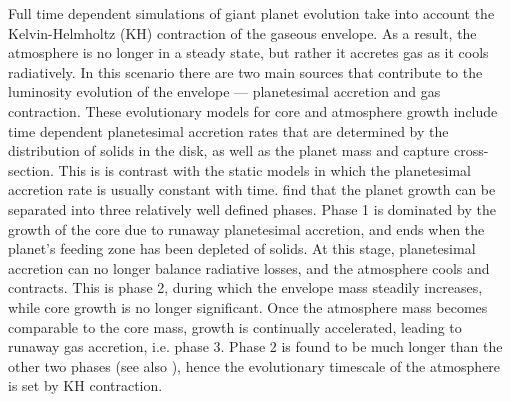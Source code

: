 \documentclass[apj, numberedappendix]{emulateapj}
\begin{document}


Full time dependent simulations of giant planet evolution take into account the Kelvin-Helmholtz (KH) contraction of the gaseous envelope. As a result, the atmosphere is no longer in a steady state, but rather it accretes gas as it cools radiatively. In this scenario there are two main sources that contribute to the luminosity evolution of the envelope --- planetesimal accretion and gas contraction. These evolutionary models for core and atmosphere growth include time dependent planetesimal accretion rates that are determined by the distribution of solids in the disk, as well as the planet mass and capture cross-section. This is is contrast with the static models in which the planetesimal accretion rate is usually constant with time. \citet{pollack96} find that the planet growth can be separated into three relatively well defined phases. Phase 1 is dominated by the growth of the core due to runaway planetesimal accretion, and ends when the planet's feeding zone has been depleted of solids. At this stage, planetesimal accretion can no longer balance radiative losses, and the atmosphere cools and contracts. This is phase 2, during which the envelope mass steadily increases, while core growth is no longer significant. Once the atmosphere mass becomes comparable to the core mass, growth is continually accelerated, leading to runaway gas accretion, i.e. phase 3. Phase 2 is found to be much longer than the other two phases (see also \citealt{alibert05}), hence the evolutionary timescale of the atmosphere is set by KH contraction.
\end{document}
